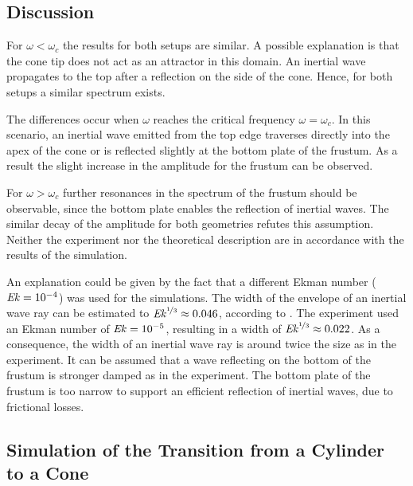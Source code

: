 \subsection{Discussion}
\label{cone:discussion_experiment}

For $\omega < \omega_c$ the results for both setups are similar.
A possible explanation is that the cone tip does not act as an attractor in this domain.
An inertial wave propagates to the top after a reflection on the side of the cone.
Hence, for both setups a similar spectrum exists.

The differences occur when $\omega$ reaches the critical frequency $\omega = \omega_c$. In this scenario, an inertial wave emitted from the
top edge traverses directly into the apex of the cone or is reflected slightly at the bottom plate of the frustum.
As a result the slight increase in the amplitude for the frustum can be observed.

For $\omega > \omega_c$ further resonances in the spectrum of the frustum should be observable,
since the bottom plate enables the reflection of inertial waves.
The similar decay of the amplitude for both geometries refutes this assumption.
Neither the experiment \citep{Beardsley1970} nor the theoretical description \citep{Greenspan1990}
are in accordance with the results of the simulation.

An explanation could be given by the fact that a different Ekman number ($\mbox{\textit{Ek}} = 10^{-4}$) was used for the simulations.
The width of the envelope of an inertial wave ray can be estimated to $\mbox{\textit{Ek}}^{\nicefrac{1}{3}}\approx 0.046$, according to \citep{Tilgner2000}.
The experiment used an Ekman number of $\mbox{\textit{Ek}} = 10^{-5}$, resulting in a  width of $\mbox{\textit{Ek}}^{\nicefrac{1}{3}}\approx 0.022$.
As a consequence, the width of an inertial wave ray is around twice the size as in the experiment.
It can be assumed that a wave reflecting on the bottom of the frustum
is stronger damped as in the experiment.
The bottom plate of the frustum is too narrow to support an efficient reflection
of inertial waves, due to frictional losses.\\

\subsection{Simulation of the Transition from a Cylinder to a Cone}

